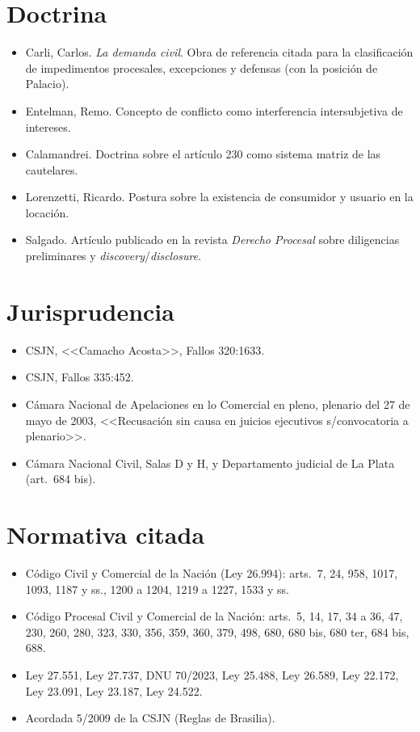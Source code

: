 \documentclass[12pt,oneside]{book}
\begin{document}
\section*{Doctrina}
\begin{itemize}
\item Carli, Carlos. \emph{La demanda civil}. Obra de referencia citada para la clasificación de impedimentos procesales, excepciones y defensas (con la posición de Palacio).
\item Entelman, Remo. Concepto de conflicto como interferencia intersubjetiva de intereses.
\item Calamandrei. Doctrina sobre el artículo 230 como sistema matriz de las cautelares.
\item Lorenzetti, Ricardo. Postura sobre la existencia de consumidor y usuario en la locación.
\item Salgado. Artículo publicado en la revista \emph{Derecho Procesal} sobre diligencias preliminares y \emph{discovery}/\emph{disclosure}.
\end{itemize}

\section*{Jurisprudencia}
\begin{itemize}
\item CSJN, <<Camacho Acosta>>, Fallos 320:1633.
\item CSJN, Fallos 335:452.
\item Cámara Nacional de Apelaciones en lo Comercial en pleno, plenario del 27 de mayo de 2003, <<Recusación sin causa en juicios ejecutivos s/convocatoria a plenario>>.
\item Cámara Nacional Civil, Salas D y H, y Departamento judicial de La Plata (art.\ 684 bis).
\end{itemize}

\section*{Normativa citada}
\begin{itemize}
\item Código Civil y Comercial de la Nación (Ley 26.994): arts.\ 7, 24, 958, 1017, 1093, 1187 y ss., 1200 a 1204, 1219 a 1227, 1533 y ss.
\item Código Procesal Civil y Comercial de la Nación: arts.\ 5, 14, 17, 34 a 36, 47, 230, 260, 280, 323, 330, 356, 359, 360, 379, 498, 680, 680 bis, 680 ter, 684 bis, 688.
\item Ley 27.551, Ley 27.737, DNU 70/2023, Ley 25.488, Ley 26.589, Ley 22.172, Ley 23.091, Ley 23.187, Ley 24.522.
\item Acordada 5/2009 de la CSJN (Reglas de Brasilia).
\end{itemize}
\end{document}
